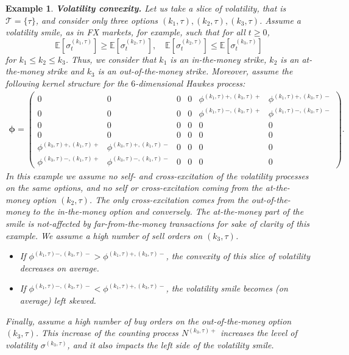 \documentclass[12pt]{article}
\newtheorem{example}[theorem2]{Example}
\begin{document}
\begin{example}
\textbf{Volatility convexity.} Let us take a slice of volatility, that is $\mathcal{T}=\{\tau\}$, and consider only three options $(k_1,\tau),(k_2,\tau),(k_3,\tau)$. Assume a volatility smile, as in FX markets, for example, such that for all $t\geq0$, $$\mathbb{E}[\sigma_t^{(k_1,\tau)}] \geq \mathbb{E}[\sigma_t^{(k_2,\tau)}], \quad \mathbb{E}[\sigma_t^{(k_2,\tau)}] \leq \mathbb{E}[\sigma_t^{(k_3,\tau)}]$$ for $k_1\leq k_2 \leq k_3$. Thus, we consider that $k_1$ is an in-the-money strike, $k_2$ is an at-the-money strike and $k_3$ is an out-of-the-money strike. Moreover, assume the following kernel structure for the $6$-dimensional Hawkes process:
\begin{align*}
\mathbf{\phi} = 
\begin{pmatrix}
    0 & 0 & 0 & 0 & \phi^{(k_1,\tau)+,(k_3,\tau)+} & \phi^{(k_1,\tau)+,(k_3,\tau)-} \\
    0 & 0 & 0&  0 & \phi^{(k_1,\tau)-,(k_3,\tau)+} & \phi^{(k_1,\tau)-,(k_3,\tau)-} \\
    0 & 0 & 0 & 0 & 0 & 0 \\
    0 & 0 & 0 & 0 & 0 & 0 \\
    \phi^{(k_3,\tau)+,(k_1,\tau)+} & \phi^{(k_3,\tau)+,(k_1,\tau)-} & 0 & 0 & 0 & 0\\
    \phi^{(k_3,\tau)-,(k_1,\tau)+} & \phi^{(k_3,\tau)-,(k_1,\tau)-} & 0 & 0 & 0 & 0
\end{pmatrix}.
\end{align*}
In this example we assume no self- and cross-excitation of the volatility processes on the same options, and no self or cross-excitation coming from the at-the-money option $(k_2,\tau)$. The only cross-excitation comes from the out-of-the-money to the in-the-money option and conversely.  The at-the-money part of the smile is not-affected by far-from-the-money transactions for sake of clarity of this example. We assume a high number of sell orders on $(k_3,\tau)$. 
\begin{itemize}
    \item If $\phi^{(k_1,\tau)-,(k_3,\tau)-}>\phi^{(k_1,\tau)+,(k_3,\tau)-}$, the convexity of this slice of volatility decreases on average. 
    \item If $\phi^{(k_1,\tau)-,(k_3,\tau)-}<\phi^{(k_1,\tau)+,(k_3,\tau)-}$, the volatility smile becomes (on average) left skewed. 
\end{itemize}
Finally, assume a high number of buy orders on the out-of-the-money option $(k_3,\tau)$. This increase of the counting process $N^{(k_3,\tau)+}$ increases the level of volatility $\sigma^{(k_3,\tau)}$, and it also impacts the left side of the volatility smile. 

\end{example}
\end{document}
